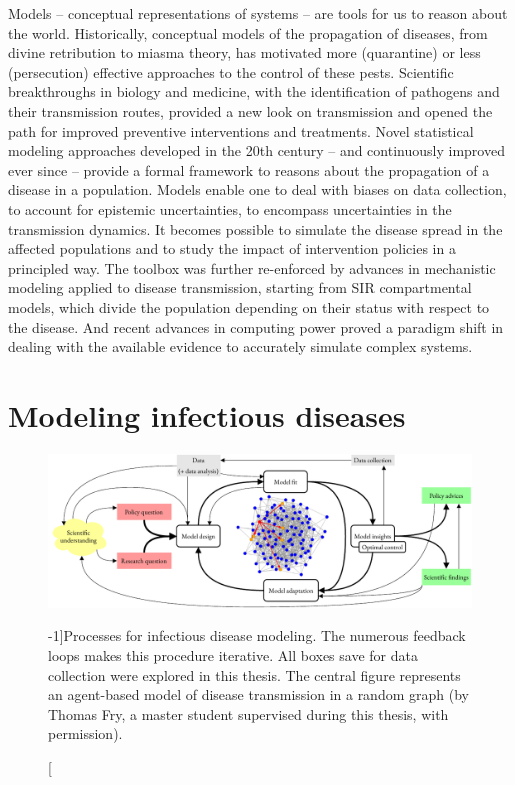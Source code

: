 Models -- conceptual representations of systems -- are tools for us to reason about the world. Historically, conceptual models of the propagation of diseases, from divine retribution to miasma theory, has motivated more (quarantine) or less (persecution) effective approaches to the control of these pests. Scientific breakthroughs in biology and medicine, with the identification of pathogens and their transmission routes, provided a new look on transmission and opened the path for improved preventive interventions and treatments. Novel statistical modeling approaches\cite[-3\baselineskip]{Freedman:AssociationCausationRemarks:1999} developed in the 20th century -- and continuously improved ever since\cite{Gelman:WhatAreMost:2021} --  provide a formal framework to reasons about the propagation of a disease in a population. Models enable one to deal with biases on data collection, to account for epistemic uncertainties, to encompass uncertainties in the transmission dynamics. It becomes possible to simulate the disease spread in the affected populations and to study the impact of intervention policies in a principled way. The toolbox was further re-enforced by advances in mechanistic modeling applied to disease transmission, starting from SIR compartmental models\cite{Kermack:ContributionMathematicalTheory:1927, Anderson:PopulationBiologyInfectious:1979}, which divide the population depending on their status with respect to the disease. And recent advances in computing power proved a paradigm shift in dealing with the available evidence to accurately simulate complex systems.



\section{Modeling infectious diseases}
 \begin{figure}\centering
  \includegraphics{fig/modeling_cycle}
  \caption[Processes for infectious disease modeling][-1\baselineskip]{Processes for  infectious disease modeling. The numerous feedback loops makes this procedure iterative. All boxes save for data collection were explored in this thesis. The central figure represents an agent-based model of disease transmission in a random graph (by Thomas Fry, a master student supervised during this thesis, with permission).}\label{fig:modeling}
\end{figure}

